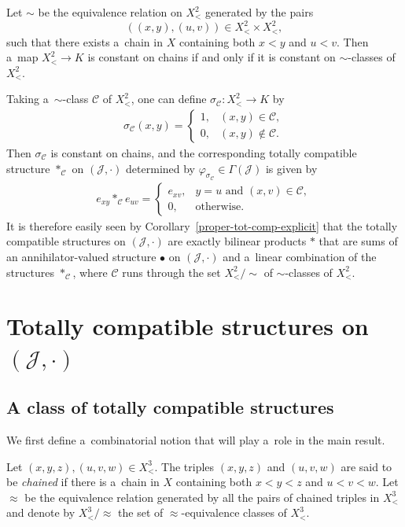 \documentclass{jonasart}
\newcommand{\bl}{\bullet}
\newcommand{\C}{\mathcal{C}}
\newcommand{\G}{\Gamma}
\newcommand{\J}{\mathcal{J}}
\newcommand{\sg}{\sigma}
\newcommand{\vf}{\varphi}
\begin{document}
	\begin{remark}\label{proper-str-as-bl+lin-comb}
		Let $\sim$ be the equivalence relation on $X^2_<$ generated by the pairs
        \[
            ((x,y),(u,v))\in X^2_<\times X^2_<,
        \]
        such that there exists a~chain in $X$ containing both $x<y$ and $u<v$. Then a~map $X^2_<\to K$ is constant on chains if and only if it is constant on $\sim$-classes of $X^2_<$.

		Taking a~$\sim$-class $\C$ of $X^2_<$, one can define $\sg_\C:X^2_<\to K$ by
		\begin{align*}
			\sg_\C(x,y)=
			\begin{cases}
				1, & (x,y)\in\C,\\
				0, & (x,y)\not\in\C.
			\end{cases}
		\end{align*}
		Then $\sg_\C$ is constant on chains, and the corresponding totally compatible structure $*_\C$ on $(\J,\cdot)$ determined by $\vf_{\sg_\C}\in\G(\J)$ is given by
		\begin{align*}
			e_{xy}*_\C e_{uv}=
			\begin{cases}
				e_{xv}, & y=u\text{ and }(x,v)\in\C,\\
				0, & \text{otherwise}.
			\end{cases}
		\end{align*}
		It is therefore easily seen by Corollary~\ref{proper-tot-comp-explicit} that the totally compatible structures on $(\J,\cdot)$ are exactly bilinear products $*$ that are sums of an annihilator-valued structure $\bl$ on $(\J,\cdot)$ and a~linear combination of the structures $*_\C$, where $\C$ runs through the set $X^2_< /{\sim}$ of $\sim$-classes of $X^2_<$.
	\end{remark}

	\section{Totally compatible structures on $(\J,\cdot)$}\label{sec-tot-comp}

	\subsection{A class of totally compatible structures}

	We first define a~combinatorial notion that will play a~role in the main result.
	\begin{definition}
		Let $(x,y,z),(u,v,w)\in X^3_<$. The triples $(x,y,z)$ and $(u,v,w)$ are said to be \textit{chained} if there is a~chain in $X$ containing both $x<y<z$ and $u<v<w$. Let $\approx$ be the equivalence relation generated by all the pairs of chained triples in $X^3_<$ and denote by $X^3_< /{\approx}$ the set of $\approx$-equivalence classes of $X^3_<$.
	\end{definition}
\end{document}
